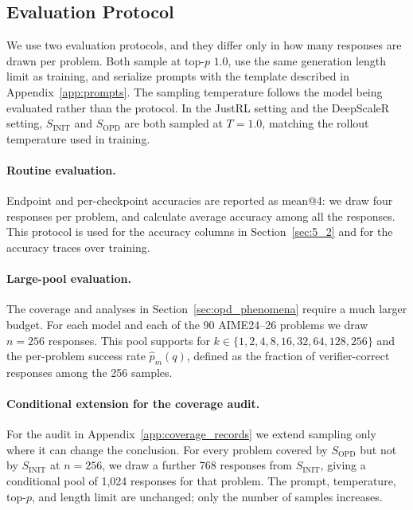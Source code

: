 \subsection{Evaluation Protocol}
\label{app:eval_protocol}

We use two evaluation protocols, and they differ only in how many responses are
drawn per problem. Both sample at top-$p$ $1.0$, use the same generation length
limit as training, and serialize prompts with the template described in
Appendix~\ref{app:prompts}. The sampling temperature follows the model being
evaluated rather than the protocol. In the JustRL setting and the DeepScaleR setting, $S_{\mathrm{INIT}}$
and $S_{\mathrm{OPD}}$ are both sampled at $T=1.0$, matching the rollout
temperature used in training.

\paragraph{Routine evaluation.}
Endpoint and per-checkpoint accuracies are reported as mean@4: we draw four
responses per problem, and calculate average accuracy among all the responses. This protocol is
used for the accuracy columns in Section~\ref{sec:5_2} and for the accuracy
traces over training.

\paragraph{Large-pool evaluation.}
The coverage and  analyses in Section~\ref{sec:opd_phenomena} require a
much larger budget. For each model and each of the 90 AIME24--26 problems we
draw $n=256$ responses. This pool supports  for
$k\in\{1,2,4,8,16,32,64,128,256\}$ and the per-problem success rate
$\hat p_m(q)$, defined as the fraction of verifier-correct responses among the
256 samples.

\paragraph{Conditional extension for the coverage audit.}
For the audit in Appendix~\ref{app:coverage_records} we extend sampling only
where it can change the conclusion. For every problem covered by
$S_{\mathrm{OPD}}$ but not by $S_{\mathrm{INIT}}$ at $n=256$, we draw a further
768 responses from $S_{\mathrm{INIT}}$, giving a conditional pool of 1{,}024
responses for that problem. The prompt, temperature, top-$p$, and length limit
are unchanged; only the number of samples increases.

